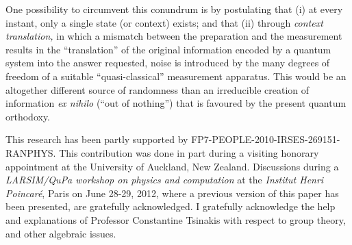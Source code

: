 \documentclass[%
  preprint,
 showpacs,
 showkeys,
 preprintnumbers,
 amsmath,amssymb,
 aps,
   pra,
  longbibliography,
 ]{revtex4-1}
\begin{document}
One possibility to circumvent this conundrum is by postulating that
(i) at every instant, only a single state (or context) exists;
and that
(ii)
through {\em context translation,}
in which a mismatch between the preparation and the measurement results in the ``translation''
of the original information encoded by a quantum system into the answer requested,
noise is introduced by the many degrees of freedom of a suitable ``quasi-classical'' measurement apparatus.
This would be an altogether different source of randomness than an
irreducible creation of information {\it ex nihilo} (``out of nothing'')
that is favoured by the present quantum orthodoxy.

\begin{acknowledgements}
 This research has been partly supported by FP7-PEOPLE-2010-IRSES-269151-RANPHYS.
This contribution was done in part during a visiting honorary appointment at the University of Auckland, New Zealand.
Discussions during a {\em LARSIM/QuPa workshop on physics and computation} at the {\it Institut Henri Poincar\'e}, Paris on June 28-29, 2012,
where a previous version of this paper has been presented, are gratefully acknowledged.
I gratefully acknowledge the help and explanations of Professor Constantine Tsinakis with respect to group theory, and other algebraic issues.
\end{acknowledgements}

 
\end{document}
